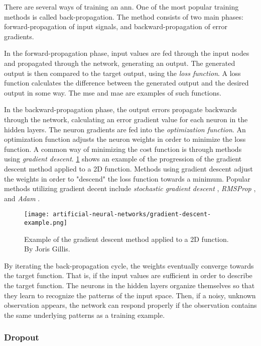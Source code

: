 There are several ways of training an \gls{ann}. One of the most popular training methods is called back-propagation. The method consists of two main phases: forward-propagation of input signals, and backward-propagation of error gradients.

In the forward-propagation phase, input values are fed through the input nodes and propagated through the network, generating an output. The generated output is then compared to the target output, using the \textit{loss function}. A loss function calculates the difference between the generated output and the desired output in some way. The \gls{mse} and \gls{mae} are examples of such functions.

In the backward-propagation phase, the output errors propagate backwards through the network, calculating an error gradient value for each neuron in the hidden layers. The neuron gradients are fed into the \textit{optimization function}. An optimization function adjusts the neuron weights in order to minimize the loss function. A common way of minimizing the cost function is through methods using \textit{gradient descent}. \cref{fig:gradient-descent-example} shows an example of the progression of the gradient descent method applied to a 2D function. Methods using gradient descent adjust the weights in order to "descend" the loss function towards a minimum. Popular methods utilizing gradient decent include \textit{stochastic gradient descent} \citep{bib:bottou2010large}, \textit{RMSProp} \citep{bib:hinton2012neural}, and \textit{Adam} \citep{bib:kingma2014adam}.

\begin{figure}
    \centering
    \texttt{[image: artificial-neural-networks/gradient-descent-example.png]}
    \caption{Example of the gradient descent method applied to a 2D function. By Joris Gillis.}
    \label{fig:gradient-descent-example}
\end{figure}

By iterating the back-propagation cycle, the weights eventually converge towards the target function. That is, if the input values are sufficient in order to describe the target function. The neurons in the hidden layers organize themselves so that they learn to recognize the patterns of the input space. Then, if a noisy, unknown observation appears, the network can respond properly if the observation contains the same underlying patterns as a training example.


\subsubsection{Dropout}

